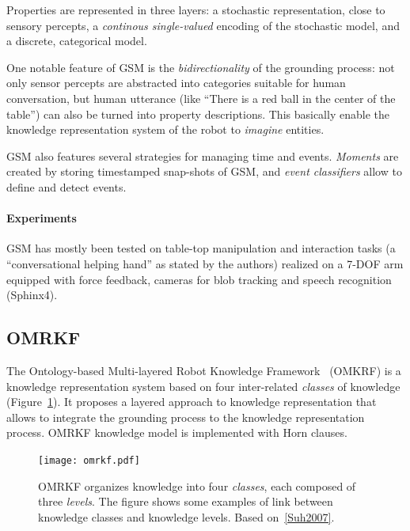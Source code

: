 \documentclass[a4paper, twocolumn]{article}
\begin{document}
Properties are represented in three layers: a stochastic representation, close
to sensory percepts, a \emph{continous single-valued} encoding of the
stochastic model, and a discrete, categorical model.

One notable feature of GSM is the \emph{bidirectionality} of the grounding
process: not only sensor percepts are abstracted into categories suitable for
human conversation, but human utterance (like ``There is a red ball in the
center of the table'') can also be turned into property descriptions. This
basically enable the knowledge representation system of the robot to
\emph{imagine} entities.

GSM also features several strategies for managing time and events.
\emph{Moments} are created by storing timestamped snap-shots of GSM, and
\emph{event classifiers} allow to define and detect events.

\paragraph{Experiments} GSM has mostly been tested on table-top manipulation
and interaction tasks (a ``conversational helping hand'' as stated by the
authors) realized on a 7-DOF arm equipped with force feedback, cameras for blob
tracking and speech recognition (Sphinx4).

\subsection{OMRKF}
\label{sect|omrkf}

The Ontology-based Multi-layered Robot Knowledge Framework~\cite{Suh2007}
(OMKRF) is a knowledge representation system based on four inter-related
\emph{classes} of knowledge (Figure~\ref{fig|omrkf}). It proposes a layered
approach to knowledge representation that allows to integrate the grounding
process to the knowledge representation process. OMRKF knowledge model is
implemented with Horn clauses.

\begin{figure}
    \centering
    \texttt{[image: omrkf.pdf]}

    \caption{OMRKF organizes knowledge into four \emph{classes}, each composed
    of three \emph{levels}. The figure shows some examples of link between
    knowledge classes and knowledge levels. Based on~\ref{Suh2007}.}

    \label{fig|omrkf}
\end{figure}
\end{document}
